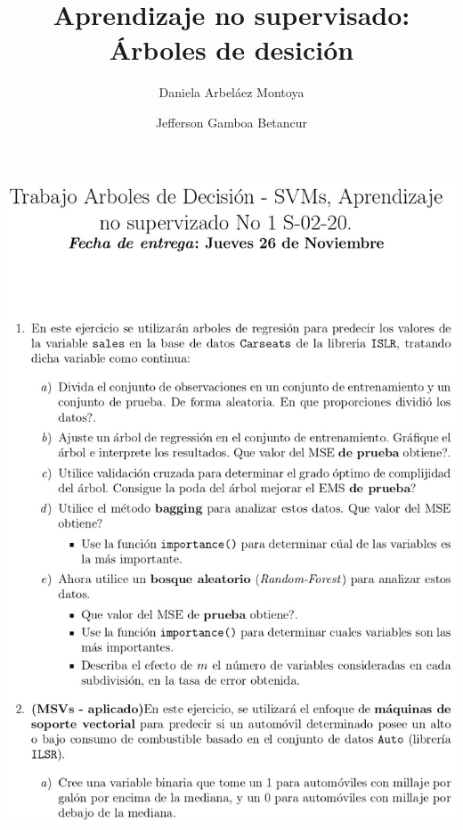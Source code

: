 \documentclass[
]{article}
\title{Aprendizaje no supervisado: Árboles de desición}
\author{Daniela Arbeláez Montoya \and Jefferson Gamboa Betancur}
\date{}
\begin{document}
\maketitle

\begin{center}\includegraphics[width=0.8\linewidth]{Trabajo1_Mod3_Sem0220_page-0001} \end{center}
\end{document}
